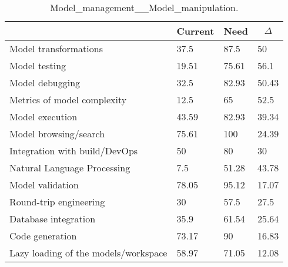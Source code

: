 
  \begin{table*}[]
  \centering
  \notsotiny
  \caption{ Model_management__Model_manipulation.}
\label{tab:model_management__model_manipulation}
\begin{tabular}{|l|l|l|l|}
  \hline
  \rowcolor[HTML]{C0C0C0}
    \multicolumn{1}{|c|}{Feature} & \multicolumn{1}{c|}{Current} & \multicolumn{1}{c|}{Need} & \multicolumn{1}{c|}{$\Delta$} \\ \hline
  Model transformations & 37.5 & 87.5 & 50 \\ \hline 
Model testing & 19.51 & 75.61 & 56.1 \\ \hline 
Model debugging & 32.5 & 82.93 & 50.43 \\ \hline 
Metrics of model complexity & 12.5 & 65 & 52.5 \\ \hline 
Model execution & 43.59 & 82.93 & 39.34 \\ \hline 
Model browsing/search & 75.61 & 100 & 24.39 \\ \hline 
Integration with build/DevOps & 50 & 80 & 30 \\ \hline 
Natural Language Processing & 7.5 & 51.28 & 43.78 \\ \hline 
Model validation & 78.05 & 95.12 & 17.07 \\ \hline 
Round-trip engineering & 30 & 57.5 & 27.5 \\ \hline 
Database integration & 35.9 & 61.54 & 25.64 \\ \hline 
Code generation & 73.17 & 90 & 16.83 \\ \hline 
Lazy loading of the models/workspace & 58.97 & 71.05 & 12.08 \\ \hline 
\end{tabular}%
  \end{table*}